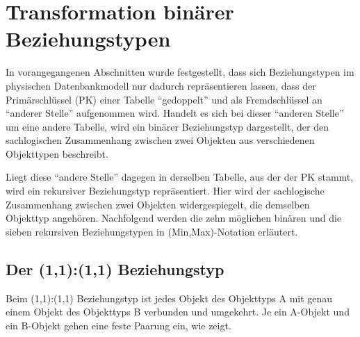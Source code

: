     \section{Transformation binärer Beziehungstypen}
      In vorangegangenen Abschnitten wurde festgestellt, dass sich Beziehungstypen im physischen Datenbankmodell nur dadurch repräsentieren lassen, dass der Primärschlüssel (PK) einer Tabelle \enquote{gedoppelt} und als Fremdschlüssel an \enquote{anderer Stelle} aufgenommen wird. Handelt es sich bei dieser \enquote{anderen Stelle} um eine andere Tabelle, wird ein binärer Beziehungstyp dargestellt, der den sachlogischen Zusammenhang zwischen zwei Objekten aus verschiedenen Objekttypen beschreibt.

      Liegt diese \enquote{andere Stelle} dagegen in derselben Tabelle, aus der der PK stammt, wird ein rekursiver Beziehungstyp repräsentiert. Hier wird der sachlogische Zusammenhang zwischen zwei Objekten widergespiegelt, die demselben Objekttyp angehören. Nachfolgend werden die zehn möglichen binären und die sieben rekursiven Beziehungstypen in (Min,Max)-Notation erläutert.
      \subsection{Der (1,1):(1,1) Beziehungstyp}
        Beim (1,1):(1,1) Beziehungstyp ist jedes Objekt des Objekttyps A mit genau einem Objekt des Objekttyps B verbunden und umgekehrt. Je ein A-Objekt und ein B-Objekt gehen eine feste Paarung ein, wie  zeigt. %

